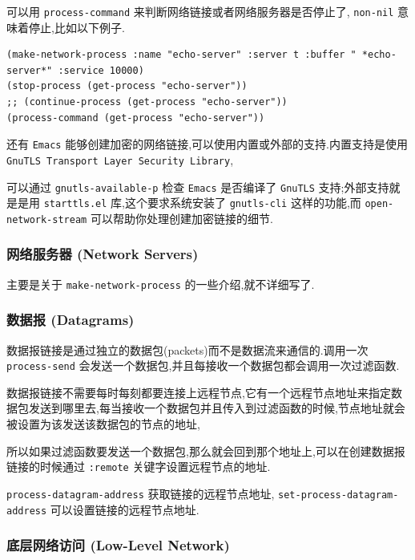 \documentclass[11pt]{article}
\begin{document}
可以用 \texttt{process-command} 来判断网络链接或者网络服务器是否停止了, \texttt{non-nil} 意味着停止,比如以下例子.

\begin{verbatim}
(make-network-process :name "echo-server" :server t :buffer " *echo-server*" :service 10000)
(stop-process (get-process "echo-server"))
;; (continue-process (get-process "echo-server"))
(process-command (get-process "echo-server"))
\end{verbatim}


还有 \texttt{Emacs} 能够创建加密的网络链接,可以使用内置或外部的支持.内置支持是使用 \texttt{GnuTLS Transport Layer Security Library},

可以通过 \texttt{gnutls-available-p} 检查 \texttt{Emacs} 是否编译了 \texttt{GnuTLS} 支持;外部支持就是是用 \texttt{starttls.el} 库,这个要求系统安装了 \texttt{gnutls-cli} 这样的功能,而 \texttt{open-network-stream} 可以帮助你处理创建加密链接的细节.



\subsubsection{网络服务器 (Network Servers)}
\label{sec:orgacf2052}

主要是关于 \texttt{make-network-process} 的一些介绍,就不详细写了.


\subsubsection{数据报 (Datagrams)}
\label{sec:orgc0d8781}

数据报链接是通过独立的数据包(packets)而不是数据流来通信的.调用一次 \texttt{process-send} 会发送一个数据包,并且每接收一个数据包都会调用一次过滤函数.

数据报链接不需要每时每刻都要连接上远程节点,它有一个远程节点地址来指定数据包发送到哪里去,每当接收一个数据包并且传入到过滤函数的时候,节点地址就会被设置为该发送该数据包的节点的地址,

所以如果过滤函数要发送一个数据包,那么就会回到那个地址上,可以在创建数据报链接的时候通过 \texttt{:remote} 关键字设置远程节点的地址.

\texttt{process-datagram-address} 获取链接的远程节点地址, \texttt{set-process-datagram-address} 可以设置链接的远程节点地址.


\subsubsection{底层网络访问 (Low-Level Network)}
\label{sec:org76cf3e4}
\end{document}

